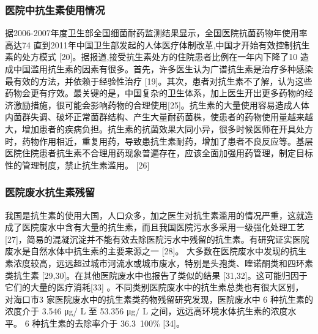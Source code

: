 \documentclass{SCIS2020cn}
\begin{document}
\subsubsection{医院中抗生素使用情况}
据2006-2007年度卫生部全国细菌耐药监测结果显示，全国医院抗菌药物年使用率高达74%
直到2011年中国卫生部发起的人体医疗体制改革,中国才开始有效控制抗生素的处方模式 [20]。据报道,接受抗生素处方的住院患者比例在一年内下降了10%
造成中国滥用抗生素的因素有很多。首先，许多医生认为广谱抗生素是治疗多种感染最有效的方法，并依赖于经验性治疗 [19]。其次，患者对抗生素不了解，认为这些药物会更有疗效。最关键的是，中国复杂的卫生体系，加上医生开出更多药物的经济激励措施，很可能会影响药物的合理使用[25]。抗生素的大量使用容易造成人体内菌群失调、破坏正常菌群结构、产生大量耐药菌株，使患者的药物使用量越来越大，增加患者的疾病负担。抗生素的抗菌效果大同小异，很多时候医师在开具处方时，药物作用相近，重复用药，导致患抗生素耐药，增加了患者不良反应等。基层医院住院患者抗生素不合理用药现象普遍存在，应该全面加强用药管理，制定目标性的管理制度，禁止抗生素滥用。 [26] 

\subsubsection{医院废水抗生素残留}
我国是抗生素的使用大国，人口众多，加之医生对抗生素滥用的情况严重，这就造成了医院废水中含有大量的抗生素，而且我国医院污水多采用一级强化处理工艺 [27]，简易的混凝沉淀并不能有效去除医院污水中残留的抗生素。有研究证实医院废水是自然水体中抗生素的主要来源之一 [28]。
大多数在医院废水中发现的抗生素浓度较高，远远超过城市河流水或城市废水，特别是头孢类、喹诺酮类和四环素类抗生素 [29,30]。在其他医院废水中也报告了类似的结果 [31,32]。这可能归因于它们的大量的医疗消耗[33] 。不同类别医院废水中的抗生素总类也有很大区别，
对海口市3 家医院废水中的抗生素类药物残留研究发现，医院废水中 6 种抗生素的浓度介于 3.546 μg/ L 至 53.356 μg/ L 之间，远远高环境水体抗生素的浓度水平。
6 种抗生素的去除率介于 36.3~100\% [34]。
\end{document}
